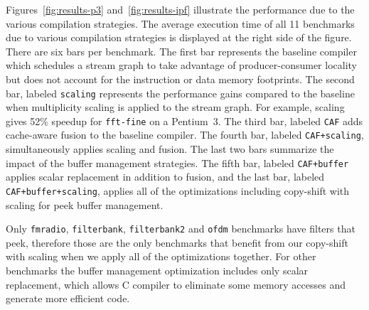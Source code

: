 



Figures~\ref{fig:results-p3} and~\ref{fig:results-ipf} illustrate the
performance due to the various compilation strategies. The average 
execution time of all 11 benchmarks due to various compilation strategies 
is displayed at the right side of the figure. There are six bars per 
benchmark. The first bar represents the baseline compiler which
schedules a stream graph to take advantage of producer-consumer
locality but does not account for the instruction or data memory
footprints. The second bar, labeled {\tt scaling} represents the
performance gains compared to the baseline when multiplicity scaling
is applied to the stream graph. For example, scaling gives 52\%
speedup for \texttt{fft-fine} on a Pentium~3. The third bar, 
labeled {\tt CAF} adds cache-aware fusion to the baseline compiler. The fourth
bar, labeled \texttt{CAF+scaling}, simultaneously applies scaling and
fusion. The last two bars summarize the impact of the buffer
management strategies. The fifth bar, labeled \texttt{CAF+buffer}
applies scalar replacement in addition to fusion, and the last bar,
labeled \texttt{CAF+buffer+scaling}, applies all of the optimizations
including copy-shift with scaling for peek buffer management.


Only \texttt{fmradio}, \texttt{filterbank}, \texttt{filterbank2}
and \texttt{ofdm} benchmarks have filters that peek, therefore those are the 
only benchmarks that benefit from our copy-shift with scaling when we 
apply all of the optimizations together. For other benchmarks
the buffer management optimization includes only scalar replacement,
which allows C compiler to eliminate some memory accesses and
generate more efficient code.

